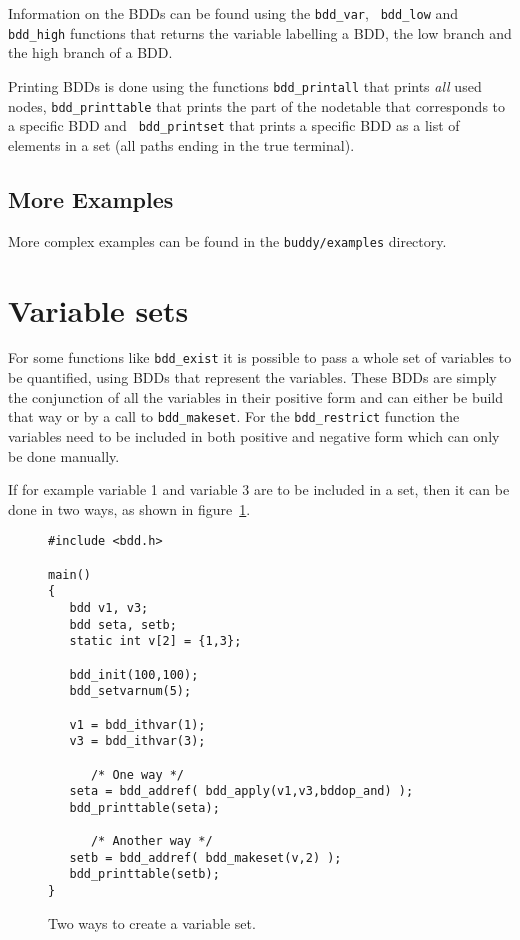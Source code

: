\documentclass[a4paper,11pt,twoside,fleqn,openright]{report}
\begin{document}
Information on the BDDs can be found using the {\tt bdd\_var}, {\tt
  bdd\_low} and {\tt bdd\_high} functions that returns the variable
labelling a BDD, the low branch and the high branch of a BDD.

Printing BDDs is done using the functions {\tt bdd\_printall} that
prints {\em all} used nodes, {\tt bdd\_printtable} that prints the
part of the nodetable that corresponds to a specific BDD and {\tt
  bdd\_printset} that prints a specific BDD as a list of elements in
a set (all paths ending in the true terminal).

\subsection{More Examples}

More complex examples can be found in the {\tt buddy/examples} directory.

\section{Variable sets} 

For some functions like {\tt bdd\_exist} it is possible to pass a
whole set of variables to be quantified, using BDDs that represent the
variables. These BDDs are simply the conjunction of all the variables
in their positive form and can either be build that way or by a call
to {\tt bdd\_makeset}. For the {\tt bdd\_restrict} function the
variables need to be included in both positive and negative form which
can only be done manually.

If for example variable 1 and variable 3 are to be included in a set,
then it can be done in two ways, as shown in figure~\ref{fig:varset}.

\begin{figure}[tb]
\begin{verbatim}
#include <bdd.h>

main()
{
   bdd v1, v3;
   bdd seta, setb;
   static int v[2] = {1,3};
   
   bdd_init(100,100);
   bdd_setvarnum(5);

   v1 = bdd_ithvar(1);
   v3 = bdd_ithvar(3);

      /* One way */
   seta = bdd_addref( bdd_apply(v1,v3,bddop_and) );
   bdd_printtable(seta);

      /* Another way */
   setb = bdd_addref( bdd_makeset(v,2) );
   bdd_printtable(setb);
}
\end{verbatim}
  \caption{Two ways to create a variable set.}
  \label{fig:varset}
\end{figure}
\end{document}

